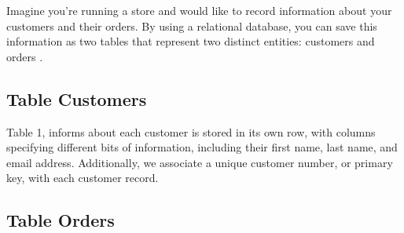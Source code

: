 \documentclass[
]{book}
\newenvironment{Shaded}{\begin{snugshade}}{\end{snugshade}}
\newcommand{\AttributeTok}[1]{\textcolor[rgb]{0.13,0.29,0.53}{#1}}
\newcommand{\DecValTok}[1]{\textcolor[rgb]{0.00,0.00,0.81}{#1}}
\newcommand{\FunctionTok}[1]{\textcolor[rgb]{0.13,0.29,0.53}{\textbf{#1}}}
\newcommand{\NormalTok}[1]{#1}
\newcommand{\OtherTok}[1]{\textcolor[rgb]{0.56,0.35,0.01}{#1}}
\newcommand{\SpecialCharTok}[1]{\textcolor[rgb]{0.81,0.36,0.00}{\textbf{#1}}}
\newcommand{\StringTok}[1]{\textcolor[rgb]{0.31,0.60,0.02}{#1}}
\begin{document}
Imagine you're running a store and would like to record information about your customers and their orders. By using a relational database, you can save this information as two tables that represent two distinct entities: customers and orders .

\hypertarget{table-customers}{%
\subsection{Table Customers}\label{table-customers}}

\begin{Shaded}
\end{Shaded}

Table 1, informs about each customer is stored in its own row, with columns specifying different bits of information, including their first name, last name, and email address. Additionally, we associate a unique customer number, or primary key, with each customer record.

\hypertarget{table-orders}{%
\subsection{Table Orders}\label{table-orders}}

\begin{Shaded}
\end{Shaded}
\end{document}
